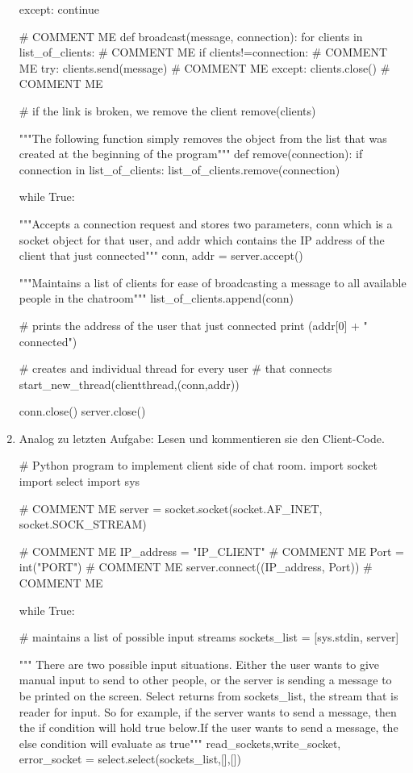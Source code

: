\documentclass[paper=a4,fontsize=11pt]{scrartcl}%
\numberwithin{equation}{section}
\begin{document}
\begin{enumerate}
\begin{python}
            except:
                continue
 
# COMMENT ME
def broadcast(message, connection):
    for clients in list_of_clients: # COMMENT ME
        if clients!=connection: # COMMENT ME
            try:
                clients.send(message) # COMMENT ME
            except:
                clients.close() # COMMENT ME
 
                # if the link is broken, we remove the client
                remove(clients)
 
"""The following function simply removes the object
from the list that was created at the beginning of
the program"""
def remove(connection):
    if connection in list_of_clients:
        list_of_clients.remove(connection)
 
while True:
 
    """Accepts a connection request and stores two parameters,
    conn which is a socket object for that user, and addr
    which contains the IP address of the client that just
    connected"""
    conn, addr = server.accept()
 
    """Maintains a list of clients for ease of broadcasting
    a message to all available people in the chatroom"""
    list_of_clients.append(conn)
 
    # prints the address of the user that just connected
    print (addr[0] + " connected")
 
    # creates and individual thread for every user
    # that connects
    start_new_thread(clientthread,(conn,addr))    
 
conn.close()
server.close()
\end{python}
	\item Analog zu letzten Aufgabe: Lesen und kommentieren sie den Client-Code.
	\begin{python}
	# Python program to implement client side of chat room.
import socket
import select
import sys

# COMMENT ME
server = socket.socket(socket.AF_INET, socket.SOCK_STREAM) 

# COMMENT ME
IP_address = "IP_CLIENT" # COMMENT ME
Port = int("PORT") # COMMENT ME
server.connect((IP_address, Port)) # COMMENT ME
 
while True:
 
    # maintains a list of possible input streams
    sockets_list = [sys.stdin, server]
 
    """ There are two possible input situations. Either the
    user wants to give manual input to send to other people,
    or the server is sending a message to be printed on the
    screen. Select returns from sockets_list, the stream that
    is reader for input. So for example, if the server wants
    to send a message, then the if condition will hold true
    below.If the user wants to send a message, the else
    condition will evaluate as true"""
    read_sockets,write_socket, error_socket = select.select(sockets_list,[],[])
 

\end{python}
\end{enumerate}
\end{document}
